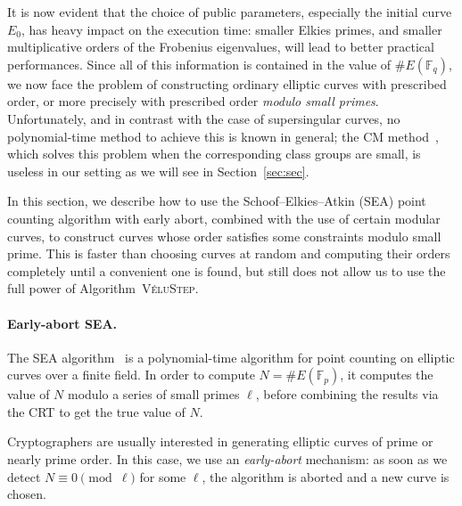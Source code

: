 \documentclass{llncs}
\newcommand{\F}{\mathbb{F}}
\newcommand{\algstyle}[1]{\textsc{#1}}
\begin{document}
It is now evident that the choice of public parameters, especially
the initial curve $E_0$, has heavy impact on the execution time:
smaller Elkies primes,
and smaller multiplicative orders of the Frobenius eigenvalues, will
lead to better practical performances. Since all of this information
is contained in the value of $\# E(\F_q)$, we now face the problem
of constructing ordinary elliptic curves with prescribed
order, or more precisely with prescribed order \emph{modulo small
primes}. Unfortunately, and in contrast with the case of
supersingular curves, no polynomial-time method to achieve this 
is known in general; the CM method~\cite{AtkinMorain93,Sutherland2012},
which solves this problem
when the corresponding class groups are small, is useless in our
setting as we will see in Section~\ref{sec:sec}.

In this section, we describe how to use the Schoof--Elkies--Atkin (SEA) point counting
algorithm with early abort, combined with the use of certain modular curves,
to construct curves whose order satisfies some constraints
modulo small prime.
This is faster than choosing curves at random and computing their orders
completely until a convenient one is found, but still does not allow us
to use the full power of Algorithm~\algstyle{VéluStep}.

\paragraph{Early-abort SEA.}
The SEA algorithm~\cite{schoof95,Morain95}
is a polynomial-time algorithm for
point counting on elliptic curves over a finite field. In order to compute
$N = \# E(\F_p)$, it computes the value of $N$ modulo a series
of small primes $\ell$, before combining the results via the CRT
to get the true value of $N$.

Cryptographers are usually interested in generating elliptic curves of
prime or nearly prime order. In this case, we use an \emph{early-abort}
mechanism: as soon as we detect $N \equiv 0\pmod{\ell}$ for some $\ell$, the algorithm is aborted
and a new curve is chosen.
\end{document}
